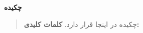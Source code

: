 \thispagestyle{empty}
\centerline{\textbf{\large{چکیده}}}
\begin{quote}

چکیده در اینجا قرار دارد.
\vskip 1cm
\textbf{کلمات کلیدی:} 
\end{quote}